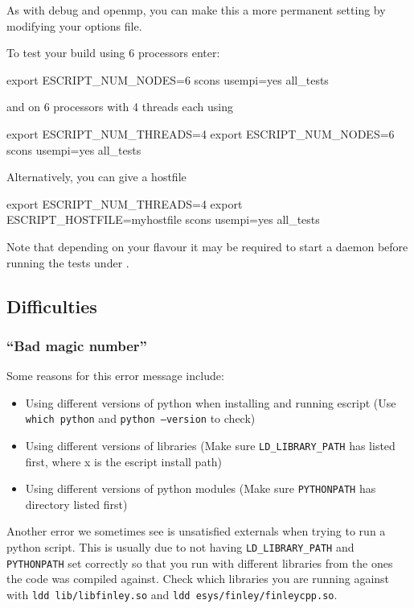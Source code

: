 As with debug and openmp, you can make this a more permanent setting by modifying your options file.

To test your build using 6 processors enter:
\begin{shellCode}
export ESCRIPT_NUM_NODES=6
scons usempi=yes all_tests
\end{shellCode}
and on 6 processors with 4 threads each using 
\begin{shellCode}
export ESCRIPT_NUM_THREADS=4
export ESCRIPT_NUM_NODES=6
scons usempi=yes all_tests
\end{shellCode}
Alternatively, you can give a hostfile
\begin{shellCode}
export ESCRIPT_NUM_THREADS=4
export ESCRIPT_HOSTFILE=myhostfile
scons usempi=yes all_tests
\end{shellCode}
Note that depending on your \mpi flavour it may be required to start a daemon before running the tests under \mpi.


\subsection{Difficulties}

\subsubsection{``Bad magic number''}
Some reasons for this error message include:
\begin{itemize}
 \item Using different versions of python when installing and running escript (Use \texttt{which python} and \texttt{python --version} to check)
\item Using different versions of libraries (Make sure \texttt{LD_LIBRARY_PATH} has  listed first, where x is the escript install path)
\item Using different versions of python modules (Make sure \texttt{PYTHONPATH} has  directory listed first) 
\end{itemize}

Another error we sometimes see is unsatisfied externals when trying to run a python script. This is usually due to not having \texttt{LD_LIBRARY_PATH} and \texttt{PYTHONPATH} set correctly so that you run with different libraries from the ones the code was compiled against. Check which libraries you are running against with \texttt{ldd lib/libfinley.so} and \texttt{ldd esys/finley/finleycpp.so}.


